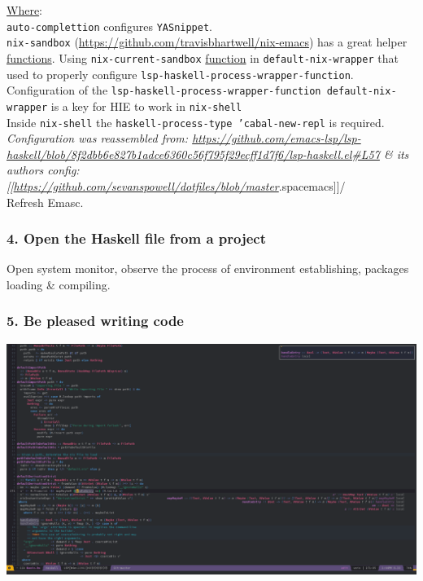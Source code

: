 \documentclass[11pt]{article}
\begin{document}
\hyperref[org3e5903d]{Where}:\\

\texttt{auto-complettion} configures \texttt{YASnippet}.\\

\texttt{nix-sandbox} (\url{https://github.com/travisbhartwell/nix-emacs}) has a great helper \hyperref[orgaa8fb87]{functions}. Using \texttt{nix-current-sandbox} \hyperref[orge15bc14]{function} in \texttt{default-nix-wrapper} that used to properly configure \texttt{lsp-haskell-process-wrapper-function}.\\

Configuration of the \texttt{lsp-haskell-process-wrapper-function default-nix-wrapper} is a key for HIE to work in \texttt{nix-shell}\\

Inside \texttt{nix-shell} the \texttt{haskell-process-type 'cabal-new-repl} is required.\\

\emph{Configuration was reassembled from: \url{https://github.com/emacs-lsp/lsp-haskell/blob/8f2dbb6e827b1adce6360c56f795f29ecff1d7f6/lsp-haskell.el\#L57} \& its authors config: [[\url{https://github.com/sevanspowell/dotfiles/blob/master}}.spacemacs]]/\\

Refresh Emasc.\\

\subsubsection{4. Open the Haskell file from a project}
\label{sec:org9b16ebd}

Open system monitor, observe the process of environment establishing, packages loading \& compiling.\\

\subsubsection{5. Be pleased writing code}
\label{sec:org7a017c3}

\begin{center}
\includegraphics[width=.9\linewidth]{images/Screenshot_20190727_134446.png}
\end{center}
\end{document}
